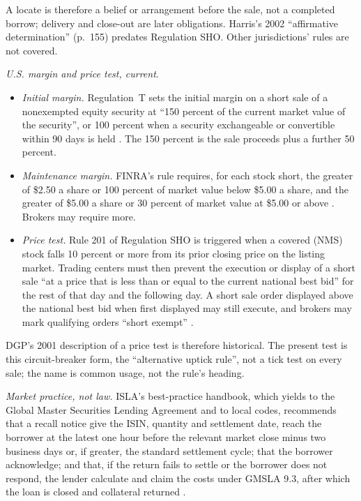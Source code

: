 \begin{qfmechanism}
A locate is therefore a belief or arrangement before the sale, not a completed borrow; delivery and close-out are later obligations. Harris's 2002 ``affirmative determination'' (p.~155) predates Regulation SHO. Other jurisdictions' rules are not covered.

\emph{U.S. margin and price test, current}.
\begin{itemize}
\item \emph{Initial margin.} Regulation~T sets the initial margin on a short sale of a nonexempted equity security at ``150 percent of the current market value of the security'', or 100 percent when a security exchangeable or convertible within 90 days is held \citep[12 CFR 220.12(c), eCFR text for 15 October 2026]{ecfr-12cfr220}. The 150 percent is the sale proceeds plus a further 50 percent.
\item \emph{Maintenance margin.} FINRA's rule requires, for each stock short, the greater of \$2.50 a share or 100 percent of market value below \$5.00 a share, and the greater of \$5.00 a share or 30 percent of market value at \$5.00 or above \citep[Rule 4210(c)(2)--(3), version from 4 June 2026]{finra-rules-2026}. Brokers may require more.
\item \emph{Price test.} Rule 201 of Regulation SHO is triggered when a covered (NMS) stock falls 10 percent or more from its prior closing price on the listing market. Trading centers must then prevent the execution or display of a short sale ``at a price that is less than or equal to the current national best bid'' for the rest of that day and the following day. A short sale order displayed above the national best bid when first displayed may still execute, and brokers may mark qualifying orders ``short exempt'' \citep[17 CFR 242.201(b)--(c), adopted 75~FR 11323, 10 March 2010, last amended 2024]{ecfr-17cfr242-201}.
\end{itemize}
DGP's 2001 description of a price test is therefore historical. The present test is this circuit-breaker form, the ``alternative uptick rule'', not a tick test on every sale; the name is common usage, not the rule's heading.

\emph{Market practice, not law.} ISLA's best-practice handbook, which yields to the Global Master Securities Lending Agreement and to local codes, recommends that a recall notice give the ISIN, quantity and settlement date, reach the borrower at the latest one hour before the relevant market close minus two business days or, if greater, the standard settlement cycle; that the borrower acknowledge; and that, if the return fails to settle or the borrower does not respond, the lender calculate and claim the costs under GMSLA 9.3, after which the loan is closed and collateral returned \citep[``Loan Recall to buy-in/close out'' and ``Legal'', pp.~2--3 and~24--25; sections last updated 28 January 2022]{al-isla}.


\end{qfmechanism}
